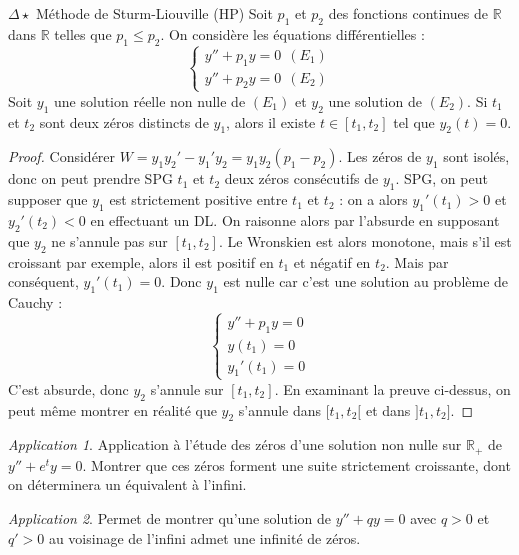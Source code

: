 \documentclass[french,a4paper]{article}
\newcommand{\R}{\mathbb{R}}
\theoremstyle{plain}
\theoremstyle{definition}
\theoremstyle{remark}
\newtheorem*{app}{Application}
\begin{document}
\begin{ex}{$\Delta\star$ Méthode de Sturm-Liouville (HP)} Soit $p_1$ et $p_2$ des fonctions continues de $\R$ dans $\R$ telles que $p_1\leqslant p_2$. On considère les équations différentielles : $$\begin{cases}
		y''+p_1y=0 \ \ (E_1) \\
		y''+p_2y=0 \ \ (E_2)
	\end{cases}$$ Soit $y_1$ une solution réelle non nulle de $(E_1)$ et $y_2$ une solution de $(E_2)$. Si $t_1$ et $t_2$ sont deux zéros distincts de $y_1$, alors il existe $t\in[t_1,t_2]$ tel que $y_2(t)=0$.
\end{ex}
\begin{proof}
	Considérer $W=y_1y_2'-y_1'y_2=y_1y_2(p_1-p_2)$. Les zéros de $y_1$ sont isolés, donc on peut prendre SPG $t_1$ et $t_2$ deux zéros consécutifs de $y_1$. SPG, on peut supposer que $y_1$ est strictement positive entre $t_1$ et $t_2$ : on a alors $y_1'(t_1)>0$ et $y_2'(t_2)<0$ en effectuant un DL. On raisonne alors par l'absurde en supposant que $y_2$ ne s'annule pas sur $[t_1,t_2]$. Le Wronskien est alors monotone, mais s'il est croissant par exemple, alors il est positif en $t_1$ et négatif en $t_2$. Mais par conséquent, $y_1'(t_1)=0$. Donc $y_1$ est nulle car c'est une solution au problème de Cauchy : $$\begin{cases}
		y''+p_1y=0 \\
		y(t_1)=0\\
		y_1'(t_1)=0
	\end{cases}$$ C'est absurde, donc $y_2$ s'annule sur $[t_1,t_2]$. En examinant la preuve ci-dessus, on peut même montrer en réalité que $y_2$ s'annule dans $[t_1,t_2[$ et dans $]t_1,t_2]$.
\end{proof}
\begin{app}
	Application à l'étude des zéros d'une solution non nulle sur $\R_+$ de $y''+e^ty=0$. Montrer que ces zéros forment une suite strictement croissante, dont on déterminera un équivalent à l'infini.
\end{app}
\begin{app}
	Permet de montrer qu'une solution de $y''+qy=0$ avec $q>0$ et $q'>0$ au voisinage de l'infini admet une infinité de zéros.
\end{app}
\end{document}
